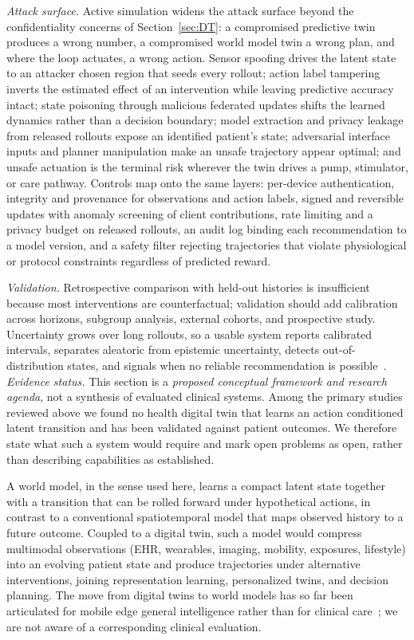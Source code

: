 \documentclass[journal]{IEEEtran}
\begin{document}
\emph{Attack surface.} Active simulation widens the attack surface beyond the confidentiality concerns of Section~\ref{sec:DT}: a compromised predictive twin produces a wrong number, a compromised world model twin a wrong plan, and where the loop actuates, a wrong action. Sensor spoofing drives the latent state to an attacker chosen region that seeds every rollout; action label tampering inverts the estimated effect of an intervention while leaving predictive accuracy intact; state poisoning through malicious federated updates shifts the learned dynamics rather than a decision boundary; model extraction and privacy leakage from released rollouts expose an identified patient's state; adversarial interface inputs and planner manipulation make an unsafe trajectory appear optimal; and unsafe actuation is the terminal risk wherever the twin drives a pump, stimulator, or care pathway. Controls map onto the same layers: per-device authentication, integrity and provenance for observations and action labels, signed and reversible updates with anomaly screening of client contributions, rate limiting and a privacy budget on released rollouts, an audit log binding each recommendation to a model version, and a safety filter rejecting trajectories that violate physiological or protocol constraints regardless of predicted reward.

\emph{Validation.} Retrospective comparison with held-out histories is insufficient because most interventions are counterfactual; validation should add calibration across horizons, subgroup analysis, external cohorts, and prospective study. Uncertainty grows over long rollouts, so a usable system reports calibrated intervals, separates aleatoric from epistemic uncertainty, detects out-of-distribution states, and signals when no reliable recommendation is possible~\cite{Sel2025VVUQ}.
\else
\emph{Evidence status.} This section is a \emph{proposed conceptual framework and research agenda}, not a synthesis of evaluated clinical systems. Among the primary studies reviewed above we found no health digital twin that learns an action conditioned latent transition and has been validated against patient outcomes. We therefore state what such a system would require and mark open problems as open, rather than describing capabilities as established.

A world model, in the sense used here, learns a compact latent state together with a transition that can be rolled forward under hypothetical actions, in contrast to a conventional spatiotemporal model that maps observed history to a future outcome. Coupled to a digital twin, such a model would compress multimodal observations (EHR, wearables, imaging, mobility, exposures, lifestyle) into an evolving patient state and produce trajectories under alternative interventions, joining representation learning, personalized twins, and decision planning. The move from digital twins to world models has so far been articulated for mobile edge general intelligence rather than for clinical care~\cite{Zheng2026DTtoWM}; we are not aware of a corresponding clinical evaluation.
\end{document}
